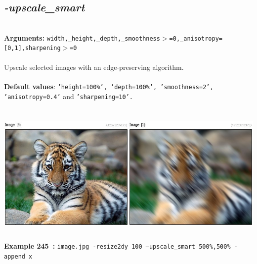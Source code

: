 \documentclass[a4paper,11pt,twoside]{book}
\begin{document}
\subsection{\emph{-upscale\_smart} }\vspace*{-0.5em}
~\\\textbf{Arguments: } 
{\small \texttt{width,\_height,\_depth,\_smoothness$>$=0,\_anisotropy=[0,1],sharpening$>$=0}}\\~\\
Upscale selected images with an edge-preserving algorithm.
~\\~\\\textbf{Default values}: {\small \texttt{'height=100\%', 'depth=100\%', 'smoothness=2', 'anisotropy=0.4'} and \texttt{'sharpening=10'.}}
\begin{center}\includegraphics[keepaspectratio=true,height=7cm,width=\textwidth]{img/gmic_def245.jpg}\\
{\footnotesize \textbf{Example 245~:} \texttt{image.jpg -resize2dy 100 --upscale\_smart 500\%,500\% -append x}}
\end{center}
\end{document}
